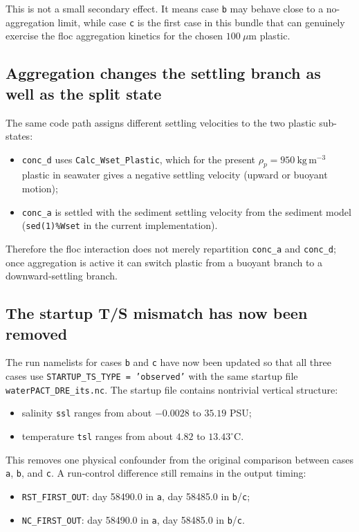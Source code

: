 \documentclass[11pt]{article}
\begin{document}
This is not a small secondary effect. It means case \texttt{b} may behave close to a no-aggregation limit,
while case \texttt{c} is the first case in this bundle that can genuinely exercise the floc aggregation
kinetics for the chosen \(100\ \mu\mathrm{m}\) plastic.

\subsection{Aggregation changes the settling branch as well as the split state}
The same code path assigns different settling velocities to the two plastic sub-states:
\begin{itemize}
\item \texttt{conc\_d} uses \texttt{Calc\_Wset\_Plastic}, which for the present
\(\rho_p = 950\ \mathrm{kg\,m^{-3}}\) plastic in seawater gives a negative settling velocity
(upward or buoyant motion);
\item \texttt{conc\_a} is settled with the sediment settling velocity from the sediment model
(\texttt{sed(1)\%Wset} in the current implementation).
\end{itemize}

Therefore the floc interaction does not merely repartition \texttt{conc\_a} and \texttt{conc\_d}; once
aggregation is active it can switch plastic from a buoyant branch to a downward-settling branch.

\subsection{The startup T/S mismatch has now been removed}
The run namelists for cases \texttt{b} and \texttt{c} have now been updated so that all three cases use
\texttt{STARTUP\_TS\_TYPE = 'observed'} with the same startup file \texttt{waterPACT\_DRE\_its.nc}. The
startup file contains nontrivial vertical structure:
\begin{itemize}
\item salinity \texttt{ssl} ranges from about \(-0.0028\) to \(35.19\) PSU;
\item temperature \texttt{tsl} ranges from about \(4.82\) to \(13.43^\circ\mathrm{C}\).
\end{itemize}

This removes one physical confounder from the original comparison between cases \texttt{a}, \texttt{b},
and \texttt{c}. A run-control difference still remains in the output timing:
\begin{itemize}
\item \texttt{RST\_FIRST\_OUT}: day 58490.0 in \texttt{a}, day 58485.0 in \texttt{b}/\texttt{c};
\item \texttt{NC\_FIRST\_OUT}: day 58490.0 in \texttt{a}, day 58485.0 in \texttt{b}/\texttt{c}.
\end{itemize}
\end{document}
